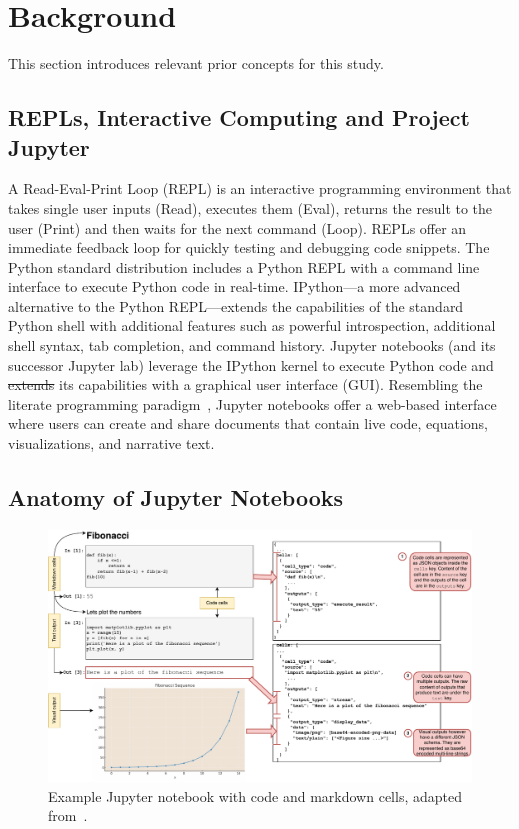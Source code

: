 \documentclass[smallextended]{svjour3}       %
\providecommand{\DIFadd}[1]{{\protect\color{blue}\uwave{#1}}} %
\providecommand{\DIFdel}[1]{{\protect\color{red}\sout{#1}}} %
\providecommand{\DIFaddbegin}{} %
\providecommand{\DIFaddend}{} %
\providecommand{\DIFdelbegin}{} %
\providecommand{\DIFdelend}{} %
\newcommand{\DIFscaledelfig}{0.5}
\newlength{\DIFdelgraphicswidth} %
\newlength{\DIFdelgraphicsheight} %
\newcommand{\DIFaddincludegraphics}[2][]{{\color{blue}\fbox{\DIFOincludegraphics[#1]{#2}}}} %
\newcommand{\DIFdelincludegraphics}[2][]{%
\sbox{\DIFdelgraphicsbox}{\DIFOincludegraphics[#1]{#2}}%
\settoboxwidth{\DIFdelgraphicswidth}{\DIFdelgraphicsbox} %
\settoboxtotalheight{\DIFdelgraphicsheight}{\DIFdelgraphicsbox} %
\scalebox{\DIFscaledelfig}{%
\parbox[b]{\DIFdelgraphicswidth}{\usebox{\DIFdelgraphicsbox}\\[-\baselineskip] \rule{\DIFdelgraphicswidth}{0em}}\llap{\resizebox{\DIFdelgraphicswidth}{\DIFdelgraphicsheight}{%
\setlength{\unitlength}{\DIFdelgraphicswidth}%
\begin{picture}(1,1)%
\thicklines\linethickness{2pt} %
{\color[rgb]{1,0,0}\put(0,0){\framebox(1,1){}}}%
{\color[rgb]{1,0,0}\put(0,0){\line( 1,1){1}}}%
{\color[rgb]{1,0,0}\put(0,1){\line(1,-1){1}}}%
\end{picture}%
}\hspace*{3pt}}} %
} %
\DeclareRobustCommand{\DIFaddbegin}{\DIFOaddbegin \let\includegraphics\DIFaddincludegraphics} %
\DeclareRobustCommand{\DIFaddend}{\DIFOaddend \let\includegraphics\DIFOincludegraphics} %
\DeclareRobustCommand{\DIFdelbegin}{\DIFOdelbegin \let\includegraphics\DIFdelincludegraphics} %
\DeclareRobustCommand{\DIFdelend}{\DIFOaddend \let\includegraphics\DIFOincludegraphics} %
\begin{document}
\section{Background}\label{sec:background}

This section introduces relevant prior concepts for this study.

\subsection{REPLs, Interactive Computing and Project Jupyter}

A Read-Eval-Print Loop (REPL) is an interactive programming environment that takes single user inputs (Read), executes them (Eval), returns the result to the user (Print) and then waits for the next command (Loop). REPLs offer an immediate feedback loop for quickly testing and debugging code snippets. The Python standard distribution includes a Python REPL with a command line interface to execute Python code in real-time. IPython---a more advanced alternative to the Python REPL---extends the capabilities of the standard Python shell with additional features such as powerful introspection, additional shell syntax, tab completion, and command history. Jupyter notebooks (and its successor Jupyter lab) leverage the IPython kernel to execute Python code and \DIFdelbegin \DIFdel{extends }\DIFdelend \DIFaddbegin \DIFadd{extend }\DIFaddend its capabilities with a graphical user interface (GUI). Resembling the literate programming paradigm~\citep{knuth1984literate}, Jupyter notebooks offer a web-based interface where users can create and share documents that contain live code, equations, visualizations, and narrative text.

\subsection{Anatomy of Jupyter Notebooks}

\begin{figure}
	\centering
	\includegraphics[width=\linewidth]{nb.pdf}
	\caption{Example Jupyter notebook with code and markdown cells, adapted from~\citep[Figure~1]{pimentel2019large-scale}.}
	\label{fig:nb}
\end{figure}
\end{document}
